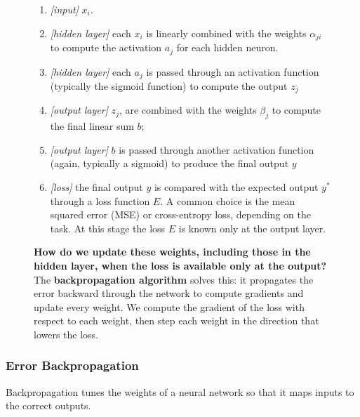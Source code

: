 \begin{figure}[h]
\begin{minipage}{0.7\textwidth}
    \begin{enumerate}
    \item[A] \textit{[input]} $x_i$.
    \item[B] \textit{[hidden layer]} each $x_i$ is linearly combined with the weights $\alpha_{ji}$ to compute the activation $a_j$ for each hidden neuron.
    \item[C] \textit{[hidden layer]} each $a_j$ is passed through an activation function (typically the sigmoid function) to compute the output $z_j$
    \item[D] \textit{[output layer]} $z_j$, are combined with the weights $\beta_j$ to compute the final linear sum $b$;
    \item[E] \textit{[output layer]} $b$ is passed through another activation function (again, typically a sigmoid) to produce the final output $y$
    \item[F] \textit{[loss]} the final output $y$ is compared with the expected output $y^*$ through a loss function $E$. A common choice is the mean squared error (MSE) or cross-entropy loss, depending on the task. At this stage the loss $E$ is known only at the output layer.
    \end{enumerate}
    \textbf{How do we update these weights, including those in the hidden layer, when the loss is available only at the output?}
    The \textbf{backpropagation algorithm} solves this: it propagates the error backward through the network to compute gradients and update every weight. We compute the gradient of the loss with respect to each weight, then step each weight in the direction that lowers the loss.
\end{minipage}
\end{figure}


\subsubsection{Error Backpropagation}
Backpropagation tunes the weights of a neural network so that it maps inputs to the correct outputs.

